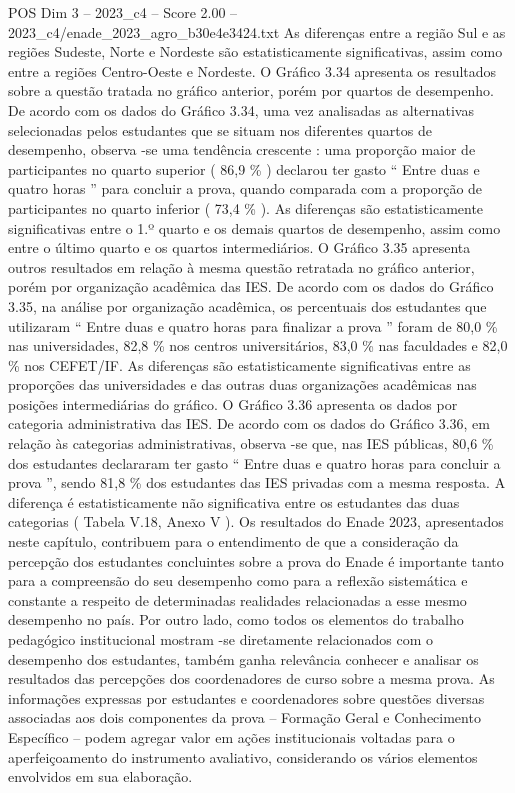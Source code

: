 \begin{textsample}{POS Dim 3 – 2023\_c4 – Score 2.00 – 2023\_c4/enade\_2023\_agro\_b30e4e3424.txt}
As diferenças entre a região Sul e as regiões Sudeste, Norte e Nordeste são estatisticamente significativas, assim como entre a regiões Centro-Oeste e Nordeste.
O Gráfico 3.34 apresenta os resultados sobre a questão tratada no gráfico anterior, porém por quartos de desempenho.
De acordo com os dados do Gráfico 3.34, uma vez analisadas as alternativas selecionadas pelos estudantes que se situam nos diferentes quartos de desempenho, observa -se uma tendência crescente : uma proporção maior de participantes no quarto superior ( 86,9 \% ) declarou ter gasto “ Entre duas e quatro horas ” para concluir a prova, quando comparada com a proporção de participantes no quarto inferior ( 73,4 \% ).
As diferenças são estatisticamente significativas entre o 1.º quarto e os demais quartos de desempenho, assim como entre o último quarto e os quartos intermediários.
O Gráfico 3.35 apresenta outros resultados em relação à mesma questão retratada no gráfico anterior, porém por organização acadêmica das IES.
De acordo com os dados do Gráfico 3.35, na análise por organização acadêmica, os percentuais dos estudantes que utilizaram “ Entre duas e quatro horas para finalizar a prova ” foram de 80,0 \% nas universidades, 82,8 \% nos centros universitários, 83,0 \% nas faculdades e 82,0 \% nos CEFET/IF.
As diferenças são estatisticamente significativas entre as proporções das universidades e das outras duas organizações acadêmicas nas posições intermediárias do gráfico.
O Gráfico 3.36 apresenta os dados por categoria administrativa das IES.
De acordo com os dados do Gráfico 3.36, em relação às categorias administrativas, observa -se que, nas IES públicas, 80,6 \% dos estudantes declararam ter gasto “ Entre duas e quatro horas para concluir a prova ”, sendo 81,8 \% dos estudantes das IES privadas com a mesma resposta.
A diferença é estatisticamente não significativa entre os estudantes das duas categorias ( Tabela V.18, Anexo V ).
Os resultados do Enade 2023, apresentados neste capítulo, contribuem para o entendimento de que a consideração da percepção dos estudantes concluintes sobre a prova do Enade é importante tanto para a compreensão do seu desempenho como para a reflexão sistemática e constante a respeito de determinadas realidades relacionadas a esse mesmo desempenho no país.
Por outro lado, como todos os elementos do trabalho pedagógico institucional mostram -se diretamente relacionados com o desempenho dos estudantes, também ganha relevância conhecer e analisar os resultados das percepções dos coordenadores de curso sobre a mesma prova.
As informações expressas por estudantes e coordenadores sobre questões diversas associadas aos dois componentes da prova – Formação Geral e Conhecimento Específico – podem agregar valor em ações institucionais voltadas para o aperfeiçoamento do instrumento avaliativo, considerando os vários elementos envolvidos em sua elaboração.

\end{textsample}
